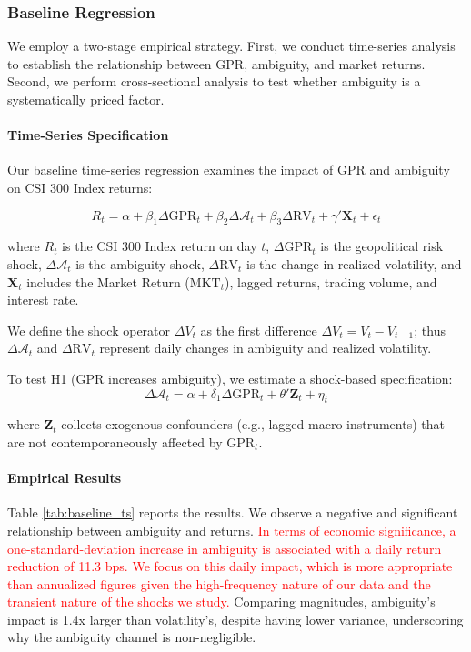 \documentclass[preprint,12pt,authoryear]{elsarticle}
\begin{document}
\subsubsection{Baseline Regression}

We employ a two-stage empirical strategy. First, we conduct time-series analysis to establish the relationship between GPR, ambiguity, and market returns. Second, we perform cross-sectional analysis to test whether ambiguity is a systematically priced factor.

\paragraph{Time-Series Specification}
Our baseline time-series regression examines the impact of GPR and ambiguity on CSI 300 Index returns:

\begin{equation}
R_{t} = \alpha + \beta_1 \Delta \text{GPR}_{t} + \beta_2 \Delta \mathcal{A}_{t} + \beta_3 \Delta \text{RV}_{t} + \gamma' \mathbf{X}_{t} + \epsilon_{t}
\end{equation}

where $R_t$ is the CSI 300 Index return on day $t$, $\Delta \text{GPR}_t$ is the geopolitical risk shock, $\Delta \mathcal{A}_t$ is the ambiguity shock, $\Delta \text{RV}_t$ is the change in realized volatility, and $\mathbf{X}_t$ includes the Market Return ($\text{MKT}_t$), lagged returns, trading volume, and interest rate.

We define the shock operator $\Delta V_t$ as the first difference $\Delta V_t = V_t - V_{t-1}$; thus $\Delta \mathcal{A}_t$ and $\Delta \text{RV}_t$ represent daily changes in ambiguity and realized volatility.

To test H1 (GPR increases ambiguity), we estimate a shock-based specification:
\begin{equation}
\Delta \mathcal{A}_{t} = \alpha + \delta_1 \Delta \text{GPR}_{t} + \theta' \mathbf{Z}_{t} + \eta_{t}
\end{equation}

where $\mathbf{Z}_t$ collects exogenous confounders (e.g., lagged macro instruments) that are not contemporaneously affected by $\text{GPR}_t$.

\paragraph{Empirical Results}
Table \ref{tab:baseline_ts} reports the results. We observe a negative and significant relationship between ambiguity and returns. \textcolor{red}{In terms of economic significance, a one-standard-deviation increase in ambiguity is associated with a daily return reduction of 11.3 bps. We focus on this daily impact, which is more appropriate than annualized figures given the high-frequency nature of our data and the transient nature of the shocks we study.} Comparing magnitudes, ambiguity's impact is 1.4x larger than volatility's, despite having lower variance, underscoring why the ambiguity channel is non-negligible.
\end{document}
